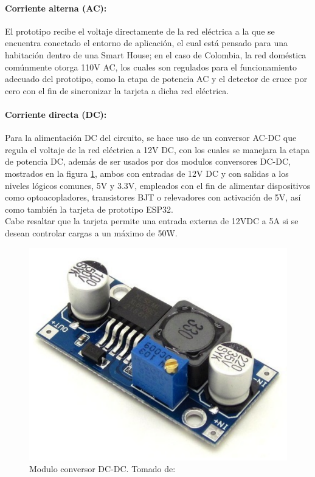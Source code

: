 	\paragraph{Corriente alterna (AC):}
		El prototipo recibe el voltaje directamente de la red eléctrica a la que se encuentra conectado el entorno de aplicación, el cual está pensado para una habitación dentro de una Smart House; en el caso de Colombia, la red doméstica comúnmente otorga 110V AC, los cuales son regulados para el funcionamiento adecuado del prototipo, como la etapa de potencia AC y el detector de cruce por cero con el fin de sincronizar la tarjeta a dicha red eléctrica.\\
		
	\paragraph{Corriente directa (DC):}
		Para la alimentación DC del circuito, se hace uso de un conversor AC-DC que regula el voltaje de la red eléctrica a 12V DC, con los cuales se manejara la etapa de potencia DC, además de ser usados por dos modulos conversores DC-DC, mostrados en la figura \ref{fig:DCDC}, ambos con entradas de 12V DC y con salidas a los niveles lógicos comunes, 5V y 3.3V, empleados con el fin de alimentar dispositivos como optoacopladores, transistores BJT o relevadores con activación de 5V, así como también la tarjeta de prototipo ESP32.\\
		
		Cabe resaltar que la tarjeta permite una entrada externa de 12VDC a 5A si se desean controlar cargas a un máximo de 50W.\\
			
		\begin{figure}[H]
			\centering
			\caption{Modulo conversor DC-DC. Tomado de: \cite{DCDC}}
			\label{fig:DCDC}
			\includegraphics[width=0.5\linewidth]{Imagenes/DCDC}
		\end{figure}
	
